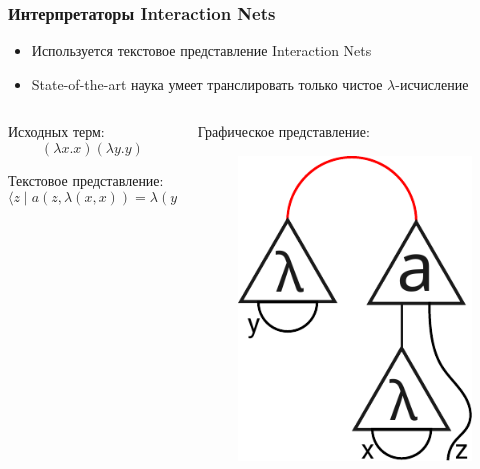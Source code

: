 \documentclass[aspectratio=169]{beamer}
\begin{document}
\begin{frame}
    \frametitle{Интерпретаторы Interaction Nets}

    \begin{itemize}
        \item Используется текстовое представление Interaction Nets
        \item State-of-the-art наука умеет транслировать только чистое $\lambda$-исчисление
    \end{itemize}

    \vspace{1em}

    \begin{columns}[t]
        \begin{column}{0.5\linewidth}
            Исходных терм: \[(\lambda x. x) (\lambda y. y)\]

            Текстовое представление:
            \[\big\langle z \mid a(z, \lambda(x, x)) = \lambda(y, y) \big\rangle\]
        \end{column}
        \begin{column}{0.5\linewidth}
            Графическое представление:
            \begin{figure}
                \includegraphics[width=0.4\linewidth]{pictures/lamda-graph.pdf}
            \end{figure}
        \end{column}
    \end{columns}

\end{frame}
\end{document}

